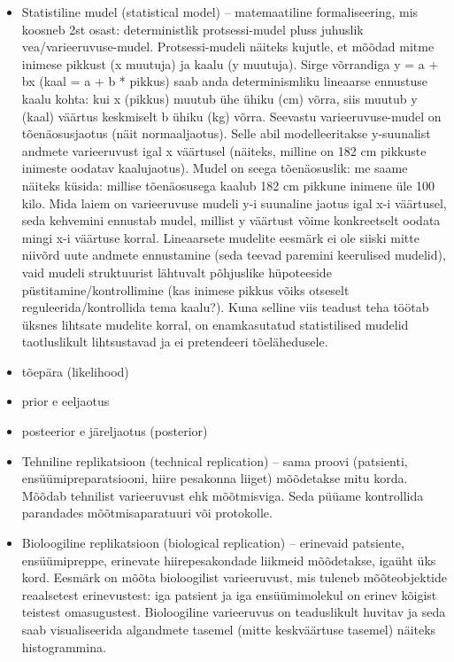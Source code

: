 \documentclass[]{book}
\begin{document}
\begin{itemize}
\item
  Statistiline mudel (statistical model) -- matemaatiline formaliseering, mis koosneb 2st osast: deterministlik protsessi-mudel pluss juhuslik vea/varieeruvuse-mudel.
  Protsessi-mudeli näiteks kujutle, et mõõdad mitme inimese pikkust (x muutuja) ja kaalu (y muutuja). Sirge võrrandiga y = a + bx (kaal = a + b * pikkus) saab anda determinismliku lineaarse ennustuse kaalu kohta: kui x (pikkus) muutub ühe ühiku (cm) võrra, siis muutub y (kaal) väärtus keskmiselt b ühiku (kg) võrra. Seevastu varieeruvuse-mudel on tõenäosusjaotus (näit normaaljaotus). Selle abil modelleeritakse
  y-suunalist andmete varieeruvust igal x väärtusel (näiteks, milline on 182 cm pikkuste inimeste oodatav kaalujaotus). Mudel on seega tõenäosuslik: me saame näiteks küsida: millise tõenäosusega kaalub 182 cm pikkune inimene üle 100 kilo. Mida laiem on varieeruvuse mudeli y-i suunaline jaotus igal x-i väärtusel, seda kehvemini ennustab mudel, millist y väärtust võime konkreetselt oodata mingi x-i väärtuse korral. Lineaarsete mudelite eesmärk ei ole siiski mitte niivõrd uute andmete ennustamine (seda teevad paremini keerulised mudelid), vaid mudeli struktuurist lähtuvalt põhjuslike hüpoteeside püstitamine/kontrollimine (kas inimese pikkus võiks otseselt reguleerida/kontrollida tema kaalu?). Kuna selline viis teadust teha töötab üksnes lihtsate mudelite korral, on enamkasutatud statistilised mudelid taotluslikult lihtsustavad ja ei pretendeeri tõelähedusele.
\item
  tõepära (likelihood)
\item
  prior e eeljaotus
\item
  posteerior e järeljaotus (posterior)
\item
  Tehniline replikatsioon (technical replication) -- sama proovi (patsienti, ensüümipreparatsiooni, hiire pesakonna liiget) mõõdetakse mitu korda. Mõõdab tehnilist varieeruvust ehk mõõtmisviga. Seda püüame kontrollida parandades mõõtmisaparatuuri või protokolle.
\item
  Bioloogiline replikatsioon (biological replication) -- erinevaid patsiente, ensüümipreppe, erinevate hiirepesakondade liikmeid mõõdetakse, igaüht üks kord. Eesmärk on mõõta bioloogilist varieeruvust, mis tuleneb mõõteobjektide reaalsetest erinevustest: iga patsient ja iga ensüümimolekul on erinev kõigist teistest omasugustest. Bioloogiline varieeruvus on teaduslikult huvitav ja seda saab visualiseerida algandmete tasemel (mitte keskväärtuse tasemel) näiteks histogrammina.

\end{itemize}
\end{document}
